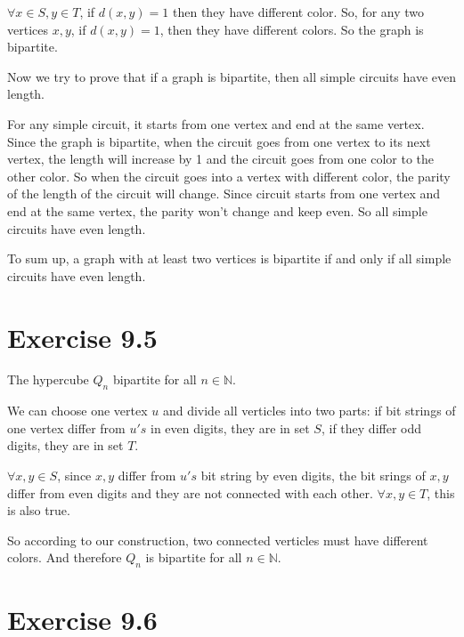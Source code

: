 \documentclass[a4paper,12pt,titlepage]{article}
\begin{document}
$\forall x\in S,y\in T$, if $d(x,y)=1$ then they have different color. So, for any two vertices $x,y$, if $d(x,y)=1$, then they have different colors. So the graph is bipartite.

Now we try to prove that if a graph is bipartite, then all simple circuits have even length.

For any simple circuit, it starts from one vertex and end at the same vertex. Since the graph is bipartite, when the circuit goes from one vertex to its next vertex, the length will increase by 1 and the circuit goes from one color to the other color. So when the circuit goes into a vertex with different color, the parity of the length of the circuit will change. Since circuit starts from one vertex and end at the same vertex, the parity won't change and keep even. So all simple circuits have even length.

To sum up, a graph with at least two vertices is bipartite if and only if all simple circuits have even length.

\section*{Exercise 9.5}
The hypercube $Q_n$ bipartite for all $n \in \mathbb{N}$.

We can choose one vertex $u$ and divide all verticles into two parts: if bit strings of one vertex differ from $u's$ in even digits, they are in set $S$, if they differ odd digits, they are in set $T$. 

$\forall x,y\in S$, since $x,y$ differ from $u's$ bit string by even digits, the bit srings of $x,y$ differ from even digits and they are not connected with each other. $\forall x,y\in T$, this is also true.

So according to our construction, two connected verticles must have different colors. And therefore $Q_n$ is bipartite for all $n\in\mathbb{N}$.

\section*{Exercise 9.6}
\end{document}
